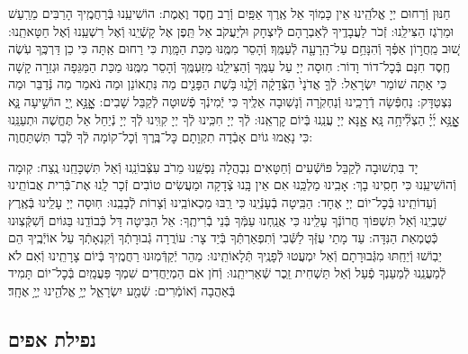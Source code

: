\documentclass[twoside, openany, parskip=half, 11pt]{book}
\begin{document}
חַנּוּן וְֿרַחוּם יְיָ אֱלֹהֵֽינוּ אֵין כָּמֽוֹךָ אֵל אֶֽרֶךְ אַפַּֽיִם וְֿרַב חֶֽסֶד וֶאֶמֶת: הוֹשִׁיעֵֽנוּ בְּֿרַחֲמֶֽיךָ הָרַבִּים מֵרַֽעַשׁ וּמֵרֹֽגֶז הַצִּילֵֽנוּ: זְֿכֹר לַעֲבָדֶֽיךָ לְֿאַבְרָהָם לְֿיִצְחָק וּלְיַעֲקֹב אַל תֵּֽפֶן אֶל קָשְֿׁיֵֽנוּ וְֿאֶל רִשְׁעֵֽנוּ וְֿאֶל חַטָּאתֵֽנוּ:
שׁ֚וּב מֵֽחֲר֣וֹן אַפֶּ֔ךָ וְֿהִנָּחֵ֥ם עַל־הָֽרָעָ֖ה לְֿעַמֶּֽךָ׃ וְֿהָסֵר מִמֶּֽנּוּ מַכַּת הַמָּֽוֶת כִּי רַחוּם אַֽתָּה כִּי כֵן דַּרְכֶּֽךָ עֹֽשֶׂה חֶֽסֶד חִנָּם בְּֿכׇל־דוֹר וָדוֹר: חֽוּסָה יְיָ עַל עַמֶּֽךָ וְֿהַצִּילֵֽנוּ מִזַּעְמֶּֽךָ וְֿהָסֵר מִמֶּֽנּוּ מַכַּת הַמַּגֵּפָה וּגְזֵרָה קָשָׁה כִּי אַתָּה שׁוֹמֵר יִשְׂרָאֵל:
לְֿךָ֤ אֲדֹנָי֙ הַצְּֿדָקָ֔ה וְֿלָ֛נוּ בֹּ֥שֶׁת הַפָּנִ֖ים מַה נִּתְאוֹנֵן וּמַה נֹּאמַר מַה נְּֿדַבֵּר וּמַה נִּצְטַדָּק: נַחְפְּֿשָׂה דְֿרָכֵֽינוּ וְֿנַחְקֹֽרָה וְֿנָשֽׁוּבָה אֵלֶֽיךָ כִּי יְֿמִינְֿךָ פְֿשׁוּטָה לְֿקַבֵּל שָׁבִים:
אׇׇׇׇָֽנָּ֣א יְ֖יָ הוֹשִׁ֣יעָה נָּ֑א אׇׇׇׇָֽנָּ֥א יְ֜יָ֗ הַצְלִ֘יחָ֥ה נָּֽא׃ אׇׇָנָּא יְיָ עֲנֵֽנוּ בְּֿיוֹם קׇרְאֵֽנוּ: לְֿךָ יְיָ חִכִּֽינוּ לְֿךָ יְיָ קִוִּֽינוּ לְֿךָ יְיָ נְֿיַחֵל אַל תֶּחֱשֶׁה וּתְעַנֵּֽנוּ כִּי נָאֲמוּ גוֹיִם אָבְֿדָה תִקְוָתָם כׇּל־בֶּֽרֶךְ וְֿכׇל־קוֹמָה לְֿךָ לְֿבַד תִּשְׁתַּחֲוֶה:

יָד בִּתְשׁוּבָה לְֿקַבֵּל פּוֹשְֿׁעִים וְֿחַטָּאִים נִבְהֲלָה נַפְשֵֽׁנוּ מֵרֹב עִצְּֿבוֹנֵֽנוּ וְֿאַל תִּשְׁכָּחֵֽנוּ נֶֽצַח: קֽוּמָה וְֿהוֹשִׁיעֵֽנוּ כִּי חָסִֽינוּ בָךְ: אָבִֽינוּ מַלְכֵּֽנוּ אִם אֵין בָּֽנוּ צְֿדָקָה וּמַעֲשִׂים טוֹבִים זְֿכָר לָֽנוּ אֶת־בְּֿרִית אֲבוֹתֵֽינוּ וְֿעֵדוֹתֵֽינוּ בְּֿכׇל־יוֹם יְיָ אֶחָד: הַבִּֽיטָה בְֿעָנְֿיֵֽנוּ כִּי רַֽבּוּ מַכְאוֹבֵֽינוּ וְֿצָרוֹת לְֿבָבֵֽנוּ: חֽוּסָה יְיָ עָלֵֽינוּ בְּֿאֶֽרֶץ שִׁבְיֵֽנוּ וְֿאַל תִּשְׁפּוֹךְ חֲרוֹנְֿךָ עָלֵֽינוּ כִּי אֲנַֽחְנוּ עַמְּֿךָ בְּֿנֵי בְֿרִיתֶֽךָ: אֵל הַבִּיטָה דַּל כְּֿבוֹדֵֽנוּ בַּגּוֹיִם וְֿשִׁקְּֿצֽוּנוּ כְּֿטֻמְאַת הַנִּדָּה: עַד מָתַי עֻזְּֿךָ לַשְּֿׁבִי וְֿתִפְאַרְתְּֿךָ בְּֿיַד צָר: עוֹרֲרָה גְֿבוּרָתְֿךָ וְֿקִנְאָתְֿךָ עַל אוֹיְֿבֶֽיךָ הֵם יֵבֽוֹשׁוּ וְֿיֵחַֽתּוּ מִגְּֿבוּרָתָם וְֿאַל יִמְעֲטוּ לְֿפָנֶֽיךָ תְּֿלָאוֹתֵֽינוּ: מַהֵר יְֿקַדְּֿמֽוּנוּ רַחֲמֶֽיךָ בְּֿיוֹם צָרָתֵֽינוּ וְֿאִם לֹא לְֿמַעֲנֵֽנוּ לְֿמַעַנְךָ פְֿעַל וְֿאַל תַּשְׁחִית זֵֽכֶר שְֿׁאֵרִיתֵֽנוּ: וְֿחֹן אֹם הַמְיַחֲדִים שִׁמְךָ פַּעֲמַֽיִם בְּֿכׇל־יוֹם תָּמִיד בְּֿאַהֲבָה וְֿאוֹמְֿרִים:
שְֿׁמַ֖ע יִשְׂרָאֵ֑ל יְיָ֥ אֱלֹהֵ֖ינוּ יְיָ֥ אֶחָֽד׃

\subsection*{ נפילת אפים }
\end{document}
